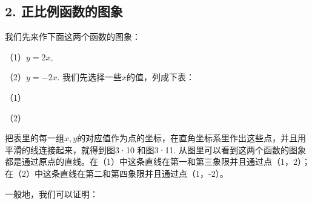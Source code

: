 \subsection{2. 正比例函数的图象}

我们先来作下面这两个函数的图象：

（1）\(y = 2x,\)

（2）\(y = -2x.\) 我们先选择一些\(x\)的值，列成下表：

（1）

{\centering
\footnotesize\setlength{\tabcolsep}{2.6pt}%
\par
}

（2）

{\centering
\footnotesize\setlength{\tabcolsep}{2.6pt}%
\par
}

把表里的每一组\(x, y\)的对应值作为点的坐标，在直角坐标系里作出这些点，并且用平滑的线连接起来，就得到图3·10
和图3·11.
从图里可以看到这两个函数的图象都是通过原点的直线。在（1）中这条直线在第一和第三象限并且通过点（1，2）；在（2）中这条直线在第二和第四象限并且通过点（1，-2）。

一般地，我们可以证明：

